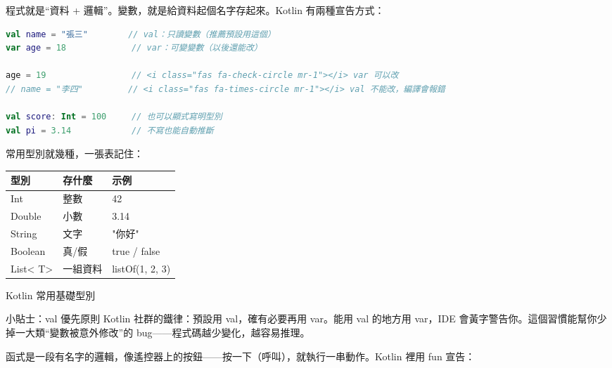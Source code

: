 


程式就是“資料 + 邏輯”。變數，就是給資料起個名字存起來。Kotlin 有兩種宣告方式：

\begin{lstlisting}[language=Kotlin]
val name = "張三"        // val：只讀變數（推薦預設用這個）
var age = 18             // var：可變變數（以後還能改）

age = 19                 // <i class="fas fa-check-circle mr-1"></i> var 可以改
// name = "李四"         // <i class="fas fa-times-circle mr-1"></i> val 不能改，編譯會報錯

val score: Int = 100     // 也可以顯式寫明型別
val pi = 3.14            // 不寫也能自動推斷
\end{lstlisting}

常用型別就幾種，一張表記住：

\begin{center}
\begin{tabularx}{\linewidth}{|X|X|X|}
\hline
\textbf{型別} & \textbf{存什麼} & \textbf{示例} \tabularnewline
\hline
Int & 整數 & 42 \tabularnewline
Double & 小數 & 3.14 \tabularnewline
String & 文字 & "你好" \tabularnewline
Boolean & 真/假 & true / false \tabularnewline
List< T> & 一組資料 & listOf(1, 2, 3) \tabularnewline
\hline
\end{tabularx}
\end{center}

\begin{center}\small\color{gray}Kotlin 常用基礎型別\end{center}

\begin{tcbinfo}{小貼士：val 優先原則}
Kotlin 社群的鐵律：預設用 val，確有必要再用 var。能用 val 的地方用 var，IDE 會黃字警告你。這個習慣能幫你少掉一大類“變數被意外修改”的 bug——程式碼越少變化，越容易推理。

\end{tcbinfo}


函式是一段有名字的邏輯，像遙控器上的按鈕——按一下（呼叫），就執行一串動作。Kotlin 裡用 fun 宣告：

